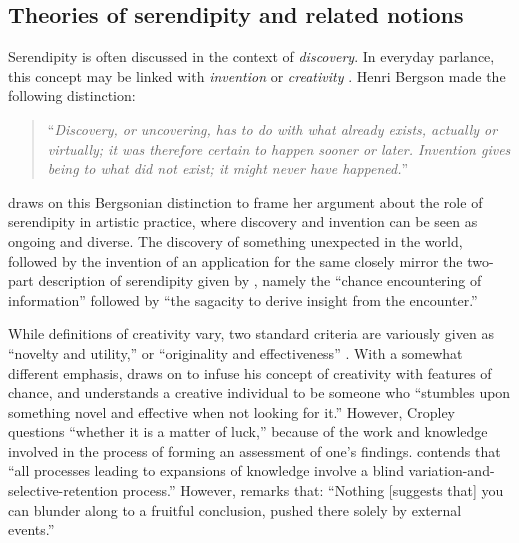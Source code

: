 \subsection{Theories of serendipity and related notions} \label{sec:serendipityInvention}
Serendipity is often discussed in the context of \emph{discovery}.  In
everyday parlance, this concept may be linked with \emph{invention} or
\emph{creativity} \cite{jordanous16plos}.  Henri Bergson made the
following distinction:
\begin{quote}
``\emph{Discovery, or uncovering, has to do with what already exists,
    actually or virtually; it was therefore certain to happen sooner
    or later.  Invention gives being to what did not exist; it might
    never have happened.}''    \cite[p. 58]{bergson1946creative}
\end{quote}
\citet{mckay-serendipity} draws on this Bergsonian distinction to
frame her argument about the role of serendipity in artistic practice,
where discovery and invention can be seen as ongoing and diverse.
The discovery of something unexpected in the world, followed by the
invention of an application for the same closely mirror the two-part
description of serendipity given by \citet{andre2009discovery}, namely
the ``chance encountering of information'' followed by ``the sagacity
to derive insight from the encounter.''

While definitions of creativity vary, two standard criteria are
variously given as ``novelty and utility,'' or ``originality and
effectiveness'' \cite{newell:63,boden,runco2012standard}.  With a
somewhat different emphasis, \citet{cropley2006praise} draws on
\citet{austin1978chase} to infuse his concept of creativity with
features of chance, and understands a creative individual to be
someone who ``stumbles upon something novel and effective when not
looking for it.''  However, Cropley questions ``whether it is a matter
of luck,'' because of the work and knowledge involved in the process
of forming an assessment of one's findings.  \citet{campbell1960blind}
contends that ``all processes leading to expansions of knowledge involve
a blind variation-and-selective-retention process.''
However, \citet[p.~49]{austin1978chase} remarks that: ``Nothing [suggests that]
you can blunder along to a fruitful conclusion, pushed there solely by
external events.''

